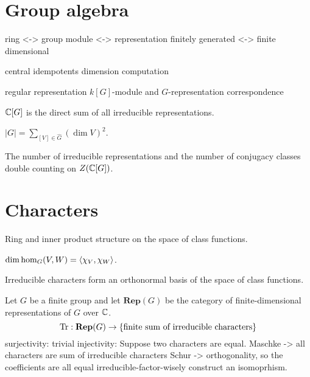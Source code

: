 \documentclass{../../large}
\begin{document}
\section{Group algebra}


\begin{prb}
ring <-> group
module <-> representation
finitely generated <-> finite dimensional
\end{prb}

\begin{prb}
central idempotents
dimension computation
\end{prb}

\begin{prb}
regular representation
$k[G]$-module and $G$-representation correspondence
\begin{parts}
\item $\mathbb{C}[G]$ is the direct sum of all irreducible representations.
\item $|G|=\sum_{[V]\in\hat G}(\dim V)^2$.
\end{parts}
\end{prb}

\begin{prb}
The number of irreducible representations and the number of conjugacy classes
double counting on $Z(\mathbb{C}[G])$.
\end{prb}



\section{Characters}




\begin{prb}
Ring and inner product structure on the space of class functions.
\begin{parts}
\item $\dim\hom_G(V,W)=\langle\chi_V,\chi_W\rangle$.
\item Irreducible characters form an orthonormal basis of the space of class functions.
\end{parts}
\end{prb}

\begin{prb}
Let $G$ be a finite group and let $\mathbf{Rep}(G)$ be the category of finite-dimensional representations of $G$ over $\mathbb{C}$.
\[\operatorname{Tr}:\mathbf{Rep}(G)\to\{\text{finite sum of irreducible characters}\}\]
surjectivity: trivial
injectivity:
	Suppose two characters are equal.
	Maschke -> all characters are sum of irreducible characters
	Schur -> orthogonality, so the coefficients are all equal
	irreducible-factor-wisely construct an isomoprhism.
\end{prb}
\end{document}
